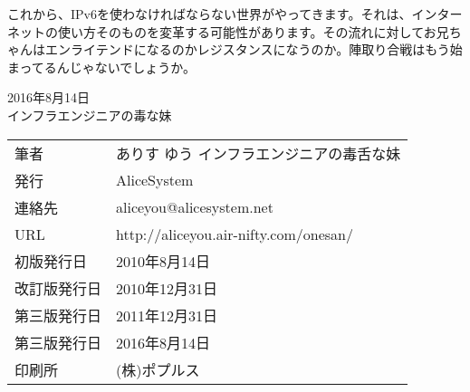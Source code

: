 これから、IPv6を使わなければならない世界がやってきます。それは、インターネットの使い方そのものを変革する可能性があります。その流れに対してお兄ちゃんはエンライテンドになるのかレジスタンスになうのか。陣取り合戦はもう始まってるんじゃないでしょうか。



\begin{flushright}
2016年8月14日 \\
インフラエンジニアの毒な妹 \\
\end{flushright}



\thispagestyle{empty}
\mbox{}
\newpage
\clearpage


\thispagestyle{empty}

\vspace*{\fill}
\begin{tabular}{ll} \toprule
筆者 & ありす ゆう インフラエンジニアの毒舌な妹 \\
発行 & AliceSystem \\
連絡先 & aliceyou@alicesystem.net \\
URL & http://aliceyou.air-nifty.com/onesan/ \\
初版発行日 & 2010年8月14日 \\
改訂版発行日 & 2010年12月31日 \\
第三版発行日 & 2011年12月31日 \\
第三版発行日 & 2016年8月14日 \\
印刷所 & (株)ポプルス \\ \bottomrule
\end{tabular}